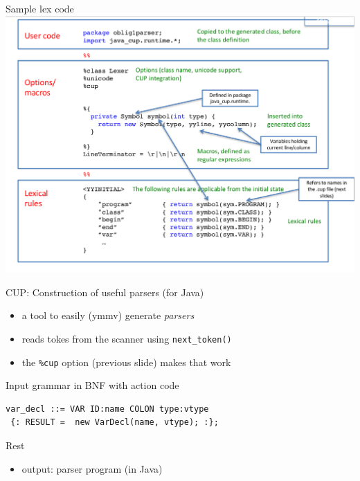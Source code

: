 \documentclass{beamer}
\begin{document}
\begin{frame}[label={sec:orgcc1dd02}]{Sample lex code}
\includegraphics[width=\textwidth]{figures/snaps/lexcode}
\end{frame}



\begin{frame}[label={sec:org55b58f7},fragile]{CUP: Construction of useful parsers (for Java)}
 \begin{itemize}
\item a tool to easily (ymmv) generate \emph{parsers}

\item reads tokes from the scanner using \texttt{next\_token()}
\item the \texttt{\%cup} option (previous slide) makes that work
\end{itemize}



\begin{block}{Input}
grammar in BNF with \alert{action} code

\begin{verbatim}
var_decl ::= VAR ID:name COLON type:vtype
 {: RESULT =  new VarDecl(name, vtype); :};
\end{verbatim}
\end{block}


\begin{block}{Rest}
\begin{itemize}
\item \alert{output}: parser program (in Java)
\end{itemize}
\end{block}
\end{frame}
\end{document}
